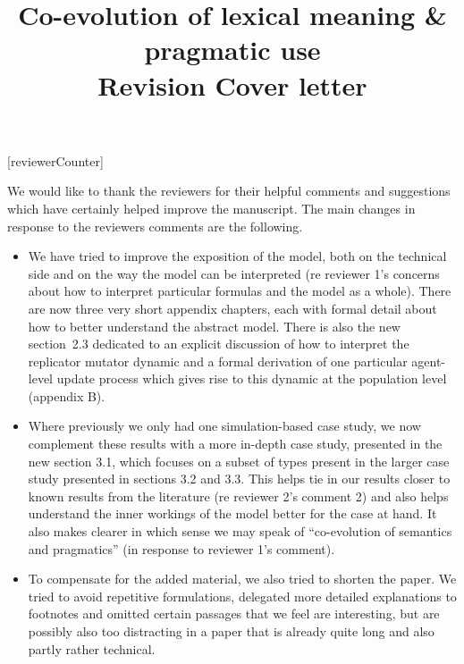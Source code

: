\documentclass[12pt,a4paper]{article}
\begin{document}
[reviewerCounter]
	\date{}

\newcommand{\mf}[1]{\textcolor{Red}{[MF: #1]}} 
\newcommand{\tb}[1]{\textcolor[rgb]{.8,.33,.0}{[TB: #1]}}%
\newcommand{\rvv}[1]{\textcolor{Steelblue}{#1}}%

\title{\Large Co-evolution of lexical meaning \& pragmatic use\\ {\bf Revision Cover letter}}

	\maketitle
\normalsize

We would like to thank the reviewers for their helpful comments and suggestions which have
certainly helped improve the manuscript. The main changes in response to the reviewers comments
are the following. 

\begin{itemize}
\item We have tried to improve the exposition of the model, both on the technical side and on
  the way the model can be interpreted (re reviewer 1's concerns about how to interpret
  particular formulas and the model as a whole). There are now three very short appendix
  chapters, each with formal detail about how to better understand the abstract model. There is
  also the new section~2.3 dedicated to an explicit discussion of how to interpret the replicator
  mutator dynamic and a formal derivation of one particular agent-level update process which
  gives rise to this dynamic at the population level (appendix B).
\item Where previously we only had one simulation-based case study, we now complement these
  results with a more in-depth case study, presented in the new section 3.1, which focuses on a
  subset of types present in the larger case study presented in sections 3.2 and 3.3. This
  helps tie in our results closer to known results from the literature (re reviewer 2's comment
  2) and also helps understand the inner workings of the model better for the case at hand. It
  also makes clearer in which sense we may speak of ``co-evolution of semantics and
  pragmatics'' (in response to reviewer 1's comment).
\item To compensate for the added material, we also tried to shorten the paper. We tried to
  avoid repetitive formulations, delegated more detailed explanations to footnotes and omitted
  certain passages that we feel are interesting, but are possibly also too distracting in a
  paper that is already quite long and also partly rather technical.
\end{itemize}
\end{document}
